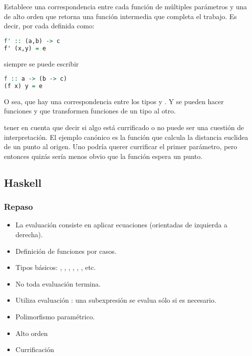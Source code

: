 Establece una correspondencia entre cada función de múltiples parámetros y una de alto orden que retorna una función intermedia que completa el trabajo. Es decir, por cada  definida como:
\begin{lstlisting}[language=Haskell]
f' :: (a,b) -> c
f' (x,y) = e
\end{lstlisting}

siempre se puede escribir

\begin{lstlisting}[language=Haskell]
f :: a -> (b -> c)
(f x) y = e
\end{lstlisting}

O sea, que hay una correspondencia entre los tipos  y . Y se pueden hacer funciones  y  que transformen funciones de un tipo al otro.

 tener en cuenta que decir si algo está currificado o no puede ser una cuestión de interpretación. El ejemplo canónico es la función  que calcula la distancia euclidea de un punto al origen. Uno podría querer currificar el primer parámetro, pero entonces quizás sería menos obvio que la función espera un punto.

\subsection{Haskell}

\subsubsection{Repaso}

\begin{itemize}
  \item La evaluación consiste en aplicar ecuaciones (orientadas de izquierda a derecha).
  \item Definición de funciones por casos.
  \item Tipos básicos: , , , , , , etc.
  \item No toda evaluación termina.
  \item Utiliza evaluación : una subexpresión se evalua sólo si es necesario.
  \item Polimorfismo paramétrico.
  \item Alto orden
  \item Currificación
\end{itemize}

